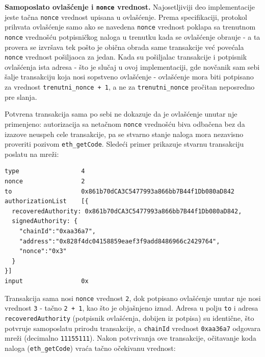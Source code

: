 \textbf{Samoposlato ovla\v s\' cenje i \texttt{nonce} vrednost.} Najosetljiviji deo implementacije jeste ta\v cna \texttt{nonce} vrednost upisana u ovla\v s\' cenje. Prema  specifikaciji, protokol prihvata ovla\v s\' cenje samo ako se navedena \texttt{nonce} vrednost poklapa sa trenutnom \texttt{nonce} vredno\v s\' cu potpisni\v ckog naloga u trenutku kada se ovla\v s\' cenje obra\dj uje - a ta provera se izvr\v sava tek po\v sto je obi\v cna obrada same transakcije ve\' c pove\' cala \texttt{nonce} vrednost po\v siljaoca za jedan. Kada su po\v siljalac transakcije i potpisnik ovla\v s\' cenja ista adresa - \v sto je slu\v caj u ovoj implementaciji, gde nov\v canik sam sebi \v salje transakciju koja nosi sopstveno ovla\v s\' cenje - ovla\v s\' cenje mora biti potpisano za vrednost \texttt{trenutni\_nonce + 1}, a ne za \texttt{trenutni\_nonce} pro\v citan neposredno pre slanja.

Potvr\dj ena transakcija sama po sebi ne dokazuje da je ovla\v s\' cenje unutar nje primenjeno: autorizacija sa neta\v cnom \texttt{nonce} vredno\v s\' cu biva odba\v cena bez da izazove neuspeh cele transakcije, pa se stvarno stanje naloga mora nezavisno proveriti pozivom \texttt{eth\_getCode}. Slede\' ci primer prikazuje stvarnu transakciju poslatu na  mre\v zi:

\begin{lstlisting}[caption={Stvarna transakcija tipa 4 sa \en{Sepolia} mre\v ze (o\v citana preko \texttt{cast tx})}, label={lst:real-tx}]
type                 4
nonce                2
to                   0x861b70dCA3C5477993a866bb7B44f1Db080aD842
authorizationList    [{
  recoveredAuthority: 0x861b70dCA3C5477993a866bb7B44f1Db080aD842,
  signedAuthority: {
    "chainId":"0xaa36a7",
    "address":"0x828f4dc04158859eaef3f9add8486966c2429764",
    "nonce":"0x3"
  }
}]
input                0x
\end{lstlisting}

Transakcija sama nosi \texttt{nonce} vrednost \texttt{2}, dok potpisano ovla\v s\' cenje unutar nje nosi vrednost \texttt{3} - ta\v cno \texttt{2 + 1}, kao \v sto je obja\v snjeno iznad. Adresa u polju \texttt{to} i adresa \texttt{recoveredAuthority} (potpisnik ovla\v s\' cenja, dobijen iz potpisa) su identi\v cne, \v sto potvr\dj uje samoposlatu prirodu transakcije, a \texttt{chainId} vrednost \texttt{0xaa36a7} odgovara  mre\v zi (decimalno \texttt{11155111}). Nakon potvr\dj ivanja ove transakcije, o\v citavanje koda naloga (\texttt{eth\_getCode}) vra\' ca ta\v cno o\v cekivanu vrednost:

